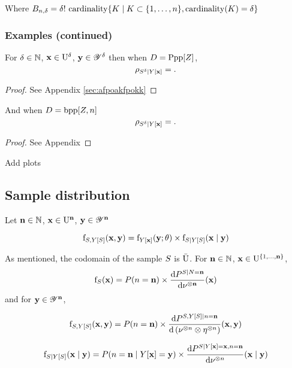 Where $B_{n,\delta}=\delta!~\mathrm{cardinality}\{K\mid K\subset\{1,\ldots,n\}, \mathrm{cardinality}(K)=\delta\}$

\subsubsection*{Examples (continued)}

For $\delta\in\mathbb{N}$, $\mathbf{x}\in \mathrm{U}^\delta$, $\mathbf{y}\in\mathscr{Y}^\delta$ then 
when $D=\mathrm{Ppp}[Z]$,  
\begin{equation}
\rho_{S^\delta\mid Y[\mathbf{x}]}=.
\end{equation}
\begin{proof}
See Appendix \ref{sec:afpoakfpokk}
\end{proof}
And 
when $D=\mathrm{bpp}[Z,n]$ 
\begin{equation}
\rho_{S^\delta\mid Y[\mathbf{x}]}=.
\end{equation}

\begin{proof}
See Appendix
\end{proof}
{\color{red}
Add plots}

\subsection{Sample distribution}
Let $\mathbf{n}\in\mathbb{N}$, $\mathbf{x}\in \mathrm{U}^{\mathbf{n}}$, $\mathbf{y}\in\mathscr{Y}^{\mathbf{n}}$ 



$$\mathrm{f}_{S,Y[S]}(\mathbf{x},\mathbf{y})=
\mathrm{f}_{Y[\mathbf{x}]}(\mathbf{y};\theta)\times \mathrm{f}_{S\mid Y[S]}(\mathbf{x}\mid\mathbf{y}) $$

As mentioned, the codomain of the sample $S$ is $\bar{\mathrm{U}}$.
For $\mathbf{n}\in\mathbb{N}$,
 $\mathbf{x}\in\mathrm{U}^{\{1,\ldots,\mathbf{n}\}}$, 
$$\mathrm{f}_{S}(\mathbf{x})=
P(n=\mathbf{n})\times \frac{\mathrm{d} P^{S\mid N=\mathbf{n}}}{\mathrm{d}\nu^{\otimes \mathbf{n}}}(\mathbf{x})$$ 
and for $\mathbf{y}\in\mathscr{Y}^{\mathbf{n}}$, 

$$\mathrm{f}_{S,Y[S]}(\mathbf{x},\mathbf{y})=
P(n=\mathbf{n})\times \frac{\mathrm{d} P^{S,Y[S]\mid n=\mathbf{n}}}{\mathrm{d}\left(\nu^{\otimes n}\otimes \eta^{\otimes n}\right)}(\mathbf{x},\mathbf{y})$$ 

$$\mathrm{f}_{S\mid Y[S]}(\mathbf{x}\mid\mathbf{y})=
P(n=\mathbf{n}\mid Y[\mathbf{x}]=\mathbf{y})\times \frac{\mathrm{d} P^{S\mid Y[\mathbf{x}]=\mathbf{x}, n=\mathbf{n}}}{\mathrm{d}\nu^{\otimes n}}(\mathbf{x}\mid\mathbf{y})$$ 

